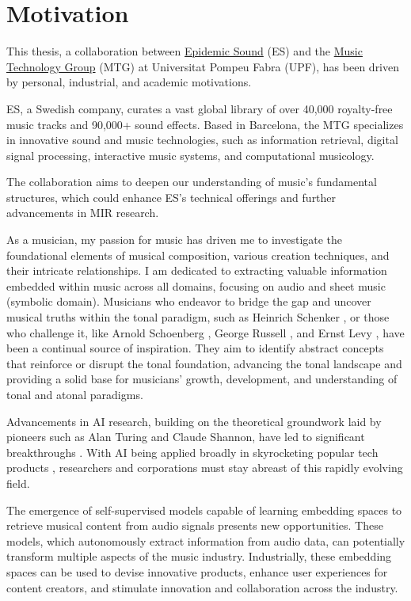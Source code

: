 \section{Motivation}

This thesis, a collaboration between \href{https://www.epidemicsound.com/}{Epidemic Sound} (ES) and the \href{https://www.upf.edu/web/mtg}{Music Technology Group} (MTG) at Universitat Pompeu Fabra (UPF), has been driven by personal, industrial, and academic motivations. 

ES, a Swedish company, curates a vast global library of over 40,000 royalty-free music tracks and 90,000+ sound effects. Based in Barcelona, the MTG specializes in innovative sound and music technologies, such as information retrieval, digital signal processing, interactive music systems, and computational musicology.

The collaboration aims to deepen our understanding of music's fundamental structures, which could enhance ES's technical offerings and further advancements in MIR research.

As a musician, my passion for music has driven me to investigate the foundational elements of musical composition, various creation techniques, and their intricate relationships. I am dedicated to extracting valuable information embedded within music across all domains, focusing on audio and sheet music (symbolic domain). Musicians who endeavor to bridge the gap and uncover musical truths within the tonal paradigm, such as Heinrich Schenker \cite{Komar1959SchenkersStructure}, or those who challenge it, like Arnold Schoenberg \cite{Samson1974SchoenbergsMusic}, George Russell \cite{LydianRussell}, and Ernst Levy \cite{LevyAHarmony}, have been a continual source of inspiration. They aim to identify abstract concepts that reinforce or disrupt the tonal foundation, advancing the tonal landscape and providing a solid base for musicians' growth, development, and understanding of tonal and atonal paradigms.

Advancements in AI research, building on the theoretical groundwork laid by pioneers such as Alan Turing and Claude Shannon, have led to significant breakthroughs \cite{Vaswani2017AttentionNeed}. With AI being applied broadly in skyrocketing popular tech products \cite{OpenAI2023GPT-4Report}, researchers and corporations must stay abreast of this rapidly evolving field. 

The emergence of self-supervised models capable of learning embedding spaces to retrieve musical content from audio signals presents new opportunities. These models, which autonomously extract information from audio data, can potentially transform multiple aspects of the music industry. Industrially, these embedding spaces can be used to devise innovative products, enhance user experiences for content creators, and stimulate innovation and collaboration across the industry.

